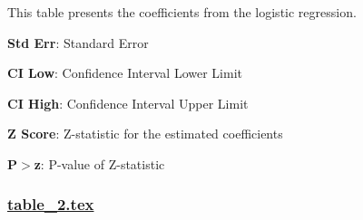 \documentclass[11pt]{article}
\begin{document}
\begin{codeoutput}
\begin{table}[h]
\caption{Test of association between state representation and interaction on Twitter.}
\label{table:StateTwitterInteraction}
\begin{threeparttable}
\renewcommand{\TPTminimum}{\linewidth}
\begin{tablenotes}
\footnotesize
\item This table presents the coefficients from the logistic regression.
\item \textbf{Std Err}: Standard Error
\item \textbf{CI Low}: Confidence Interval Lower Limit
\item \textbf{CI High}: Confidence Interval Upper Limit
\item \textbf{Z Score}: Z-statistic for the estimated coefficients
\item \textbf{P$>$\textbar{}z\textbar{}}: P-value of Z-statistic
\end{tablenotes}
\end{threeparttable}
\end{table}

\end{codeoutput}

\subsubsection*{\hyperlink{code-LaTeX Table Design-table-2-tex}{table\_2.tex}}
\end{document}
